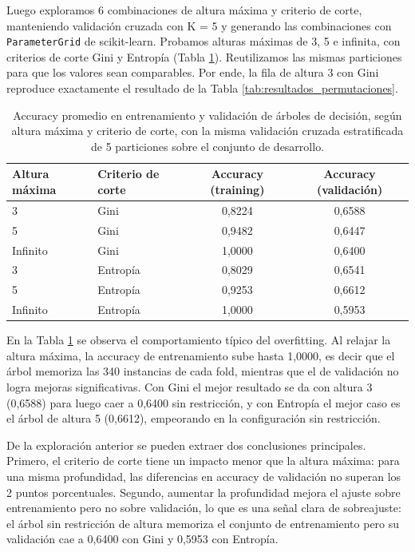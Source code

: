 \documentclass[10pt,a4paper]{article}
\begin{document}
Luego exploramos 6 combinaciones de altura máxima y criterio de corte, manteniendo validación cruzada con K = 5 y generando las combinaciones con \texttt{ParameterGrid} de scikit-learn. 
Probamos alturas máximas de 3, 5 e infinita, con criterios de corte Gini y Entropía (Tabla \ref{tab:accuracy_arboles}).
Reutilizamos las mismas particiones para que los valores sean comparables. Por ende, la fila de altura 3 con Gini reproduce exactamente el resultado de la Tabla \ref{tab:resultados_permutaciones}. 

\begin{table}[H]
\centering
\begin{tabular}{llcc}
\toprule
\textbf{Altura máxima} & \textbf{Criterio de corte} & \textbf{Accuracy (training)} & \textbf{Accuracy (validación)} \\
\midrule
3        & Gini     & 0,8224 & 0,6588 \\
5        & Gini     & 0,9482 & 0,6447 \\
Infinito & Gini     & 1,0000 & 0,6400 \\
3        & Entropía & 0,8029 & 0,6541 \\
5        & Entropía & 0,9253 & 0,6612 \\
Infinito & Entropía & 1,0000 & 0,5953 \\
\bottomrule
\end{tabular}
\caption{Accuracy promedio en entrenamiento y validación de árboles de decisión, según altura máxima y criterio de corte, con la misma validación cruzada estratificada de 5 particiones sobre el conjunto de desarrollo.}
\label{tab:accuracy_arboles}
\end{table}


En la Tabla \ref{tab:accuracy_arboles} se observa el comportamiento típico del overfitting. Al relajar la altura máxima, la accuracy de entrenamiento sube hasta 1,0000, es decir que el árbol memoriza las 340 instancias de cada fold, mientras que el de validación no logra mejoras significativas. Con Gini el mejor resultado se da con altura 3 (0,6588) para luego caer a 0,6400 sin restricción, y con Entropía el mejor caso es el árbol de altura 5 (0,6612), empeorando en la configuración sin restricción.

De la exploración anterior se pueden extraer dos conclusiones principales. Primero, el criterio de corte tiene un impacto menor que la altura máxima: para una misma profundidad, las diferencias en accuracy de validación no superan los 2 puntos porcentuales. Segundo, aumentar la profundidad mejora el ajuste sobre entrenamiento pero no sobre validación, lo que es una señal clara de sobreajuste: el árbol sin restricción de altura memoriza el conjunto de entrenamiento pero su validación cae a 0,6400 con Gini y 0,5953 con Entropía. 
\end{document}
